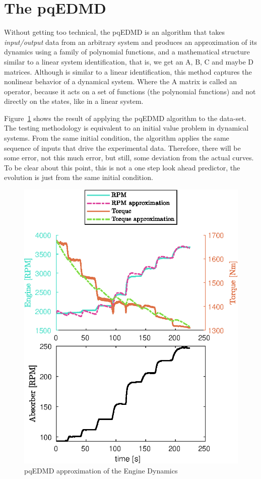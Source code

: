 \documentclass{article}
\begin{document}
\section{The pqEDMD}\label{sec:The pqEDMD} %
Without getting too technical, the pqEDMD is an algorithm that takes \textit{input/output} data from an arbitrary system and produces an approximation of its dynamics using a family of polynomial functions, and a mathematical structure similar to a linear system identification, that is, we get an A, B, C and maybe D matrices. Although is similar to a linear identification, this method captures the nonlinear behavior of a dynamical system. Where the A matrix is called an operator, because it acts on a set of functions (the polynomial functions) and not directly on the states, like in a linear system.

Figure~\ref{fig:pqEDMD_appx} shows the result of applying the pqEDMD algorithm to the data-set. The testing methodology is equivalent to an initial value problem in dynamical systems. From the same initial condition, the algorithm applies the same sequence of inputs that drive the experimental data. Therefore, there will be some error, not this much error, but still, some deviation from the actual curves. To be clear about this point, this is not a one step look ahead predictor, the evolution is just from the same initial condition.

\begin{figure}[ht]
\centering
\includegraphics[width=0.7\linewidth]{./figures/appx_fig.eps}
\caption{pqEDMD approximation of the Engine Dynamics}
\label{fig:pqEDMD_appx}
\end{figure}
\end{document}
